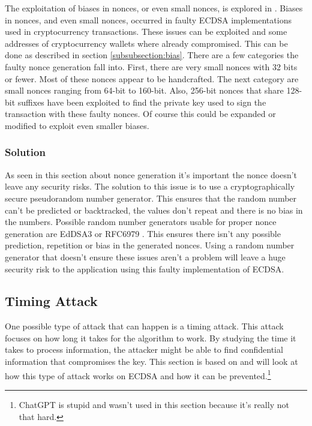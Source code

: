 The exploitation of biases in nonces, or even small nonces, is explored in \cite{cryptoeprint:2019/023}. Biases in nonces, and even small nonces, occurred in faulty ECDSA implementations used in cryptocurrency transactions. These issues can be exploited and some addresses of cryptocurrency wallets where already compromised. This can be done as described in section \ref{subsubsection:bias}. There are a few categories the faulty nonce generation fall into. First, there are very small nonces with 32 bits or fewer. Most of these nonces appear to be handcrafted. The next category are small nonces ranging from 64-bit to 160-bit. Also, 256-bit nonces that share 128-bit suffixes have been exploited to find the private key used to sign the transaction with these faulty nonces. Of course this could be expanded or modified to exploit even smaller biases. \cite{cryptoeprint:2019/023}

\subsubsection{Solution}
As seen in this section about nonce generation it's important the nonce doesn't leave any security risks. The solution to this issue is to use a cryptographically secure pseudorandom number generator. This ensures that the random number can't be predicted or backtracked, the values don't repeat and there is no bias in the numbers. Possible random number generators usable for proper nonce generation are EdDSA3 or RFC6979 \cite{cryptoeprint:2020/728}. This ensures there isn't any possible prediction, repetition or bias in the generated nonces. Using a random number generator that doesn't ensure these issues aren't a problem will leave a huge security risk to the application using this faulty implementation of ECDSA.

\subsection{Timing Attack}
One possible type of attack that can happen is a timing attack. This attack focuses on how long it takes for the algorithm to work. By studying the time it takes to process information, the attacker might be able to find confidential information that compromises the key. This section is based on \cite{cryptoeprint:2011/232} and will look at how this type of attack works on ECDSA and how it can be prevented.\footnote{ChatGPT is stupid and wasn't used in this section because it's really not that hard.}

